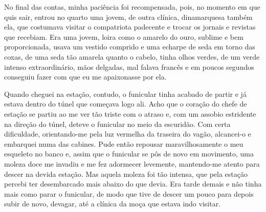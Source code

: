 No final das contas, minha paciência foi recompensada, pois, no momento
em que quis sair, entrou no quarto uma jovem, de outra clínica,
dinamarquesa também ela, que costumava visitar o compatriota padecente e
trocar os jornais e revistas que recebiam. Era uma jovem, loira como o
amarelo do ouro, sublime e bem proporcionada, usava um vestido comprido
e uma echarpe de seda em torno das coxas, de uma seda tão amarela quanto
o cabelo, tinha olhos verdes, de um verde intenso extraordinário, mãos
delgadas, mal falava francês e em poucos segundos conseguiu fazer com
que eu me apaixonasse por ela.




Quando cheguei na estação, contudo, o funicular tinha acabado de partir
e já estava dentro do túnel que começava logo ali. Acho que o coração do
chefe de estação se partiu ao me ver tão triste com o atraso e, com um
assobio estridente na direção do túnel, deteve o funicular no meio da
escuridão. Com certa dificuldade, orientando-me pela luz vermelha da
traseira do vagão, alcancei-o e embarquei numa das cabines. Pude então
repousar maravilhosamente o meu esqueleto no banco e, assim que o
funicular se pôs de novo em movimento, uma moleza doce me invadiu e me
fez adormecer levemente, mantendo-me atento para descer na devida
estação. Mas aquela moleza foi tão intensa, que pela estação percebi ter
desembarcado mais abaixo do que devia. Era tarde demais e não tinha mais
como parar o funicular, de modo que tive de descer um pouco para depois
subir de novo, devagar, até a clínica da moça que estava indo visitar.

